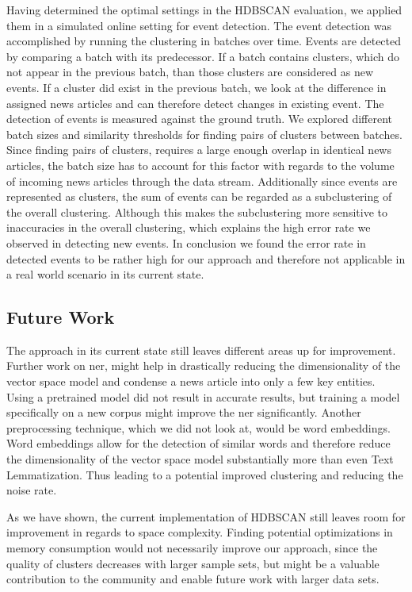 Having determined the optimal settings in the HDBSCAN evaluation,
we applied them in a simulated online setting for event detection.
The event detection was accomplished by running the clustering in batches over time.
Events are detected by comparing a batch with its predecessor.
If a batch contains clusters, which do not appear in the previous batch,
than those clusters are considered as new events.
If a cluster did exist in the previous batch,
we look at the difference in assigned news articles and can therefore detect changes in existing event.
The detection of events is measured against the ground truth.
We explored different batch sizes and similarity thresholds for finding pairs of clusters between batches.
Since finding pairs of clusters, requires a large enough overlap in identical news articles,
the batch size has to account for this factor with regards to the volume of incoming news articles through the data stream.
Additionally since events are represented as clusters,
the sum of events can be regarded as a subclustering of the overall clustering.
Although this makes the subclustering more sensitive to inaccuracies in the overall clustering,
which explains the high error rate we observed in detecting new events.
In conclusion we found the error rate in detected events to be rather high for our approach
and therefore not applicable in a real world scenario in its current state.

\subsection{Future Work}
\label{subsec:6_future_work}

The approach in its current state still leaves different areas up for improvement.
Further work on \Gls{ner}, might help in drastically reducing the dimensionality of the vector space model
and condense a news article into only a few key entities.
Using a pretrained model did not result in accurate results,
but training a model specifically on a new corpus might improve the \Gls{ner} significantly.
Another preprocessing technique, which we did not look at, would be word embeddings.
Word embeddings allow for the detection of similar words and therefore reduce the dimensionality
of the vector space model substantially more than even Text Lemmatization.
Thus leading to a potential improved clustering and reducing the noise rate.

As we have shown, the current implementation of HDBSCAN still leaves room for improvement in regards to space complexity.
Finding potential optimizations in memory consumption would not necessarily improve our approach,
since the quality of clusters decreases with larger sample sets,
but might be a valuable contribution to the community and enable future work with larger data sets.

